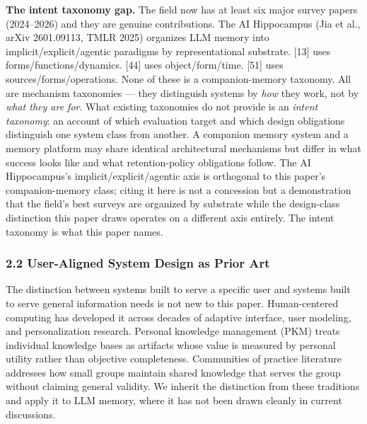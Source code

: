 \documentclass[
  11pt,
]{article}
\begin{document}
\textbf{The intent taxonomy gap.} The field now has at least six major
survey papers (2024--2026) and they are genuine contributions. The AI
Hippocampus (Jia et al., arXiv 2601.09113, TMLR 2025) organizes LLM
memory into implicit/explicit/agentic paradigms by representational
substrate. {[}13{]} uses forms/functions/dynamics. {[}44{]} uses
object/form/time. {[}51{]} uses sources/forms/operations. None of these
is a companion-memory taxonomy. All are mechanism taxonomies --- they
distinguish systems by \emph{how} they work, not by \emph{what they are
for}. What existing taxonomies do not provide is an \emph{intent
taxonomy}: an account of which evaluation target and which design
obligations distinguish one system class from another. A companion
memory system and a memory platform may share identical architectural
mechanisms but differ in what success looks like and what
retention-policy obligations follow. The AI Hippocampus's
implicit/explicit/agentic axis is orthogonal to this paper's
companion-memory class; citing it here is not a concession but a
demonstration that the field's best surveys are organized by substrate
while the design-class distinction this paper draws operates on a
different axis entirely. The intent taxonomy is what this paper names.

\hypertarget{user-aligned-system-design-as-prior-art}{%
\subsubsection{2.2 User-Aligned System Design as Prior
Art}\label{user-aligned-system-design-as-prior-art}}

The distinction between systems built to serve a specific user and
systems built to serve general information needs is not new to this
paper. Human-centered computing has developed it across decades of
adaptive interface, user modeling, and personalization research.
Personal knowledge management (PKM) treats individual knowledge bases as
artifacts whose value is measured by personal utility rather than
objective completeness. Communities of practice literature addresses how
small groups maintain shared knowledge that serves the group without
claiming general validity. We inherit the distinction from these
traditions and apply it to LLM memory, where it has not been drawn
cleanly in current discussions.
\end{document}
